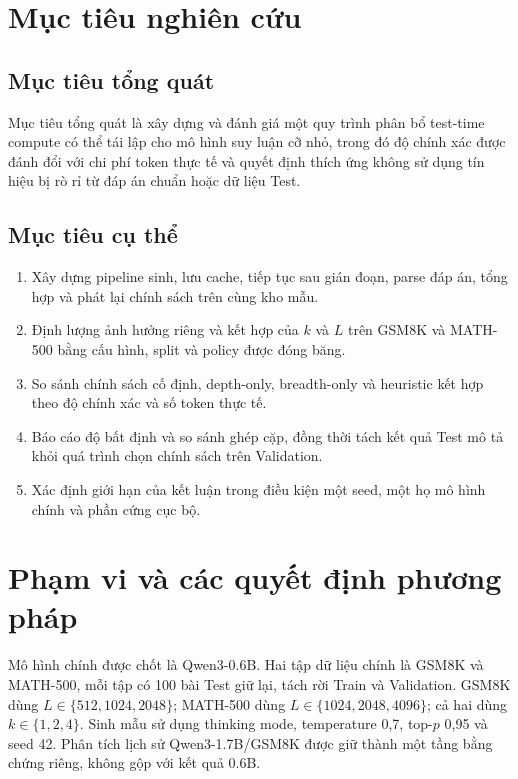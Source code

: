 \section{Mục tiêu nghiên cứu}

\subsection{Mục tiêu tổng quát}

Mục tiêu tổng quát là xây dựng và đánh giá một quy trình phân bổ test-time
compute có thể tái lập cho mô hình suy luận cỡ nhỏ, trong đó độ chính xác được
đánh đổi với chi phí token thực tế và quyết định thích ứng không sử dụng tín
hiệu bị rò rỉ từ đáp án chuẩn hoặc dữ liệu Test.

\subsection{Mục tiêu cụ thể}

\begin{enumerate}
  \item Xây dựng pipeline sinh, lưu cache, tiếp tục sau gián đoạn, parse đáp án,
  tổng hợp và phát lại chính sách trên cùng kho mẫu.
  \item Định lượng ảnh hưởng riêng và kết hợp của $k$ và $L$ trên GSM8K và
  MATH-500 bằng cấu hình, split và policy được đóng băng.
  \item So sánh chính sách cố định, depth-only, breadth-only và heuristic kết
  hợp theo độ chính xác và số token thực tế.
  \item Báo cáo độ bất định và so sánh ghép cặp, đồng thời tách kết quả Test mô
  tả khỏi quá trình chọn chính sách trên Validation.
  \item Xác định giới hạn của kết luận trong điều kiện một seed, một họ mô hình
  chính và phần cứng cục bộ.
\end{enumerate}

\section{Phạm vi và các quyết định phương pháp}

Mô hình chính được chốt là Qwen3-0.6B. Hai tập dữ liệu chính là GSM8K và
MATH-500, mỗi tập có 100 bài Test giữ lại, tách rời Train và Validation. GSM8K
dùng $L\in\{512,1024,2048\}$; MATH-500 dùng
$L\in\{1024,2048,4096\}$; cả hai dùng $k\in\{1,2,4\}$. Sinh mẫu sử dụng
thinking mode, temperature 0,7, top-$p$ 0,95 và seed 42. Phân tích lịch sử
Qwen3-1.7B/GSM8K được giữ thành một tầng bằng chứng riêng, không gộp với kết quả
0.6B.

